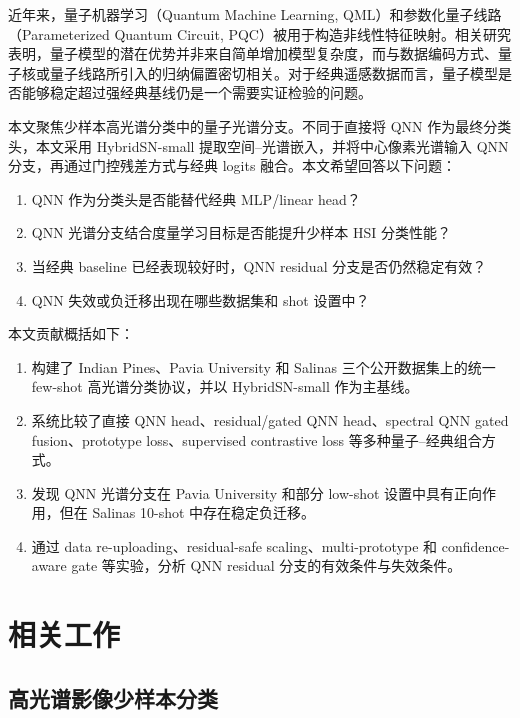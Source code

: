 \documentclass[UTF8,a4paper,zihao=-4,fontset=fandol]{ctexart}
\begin{document}
近年来，量子机器学习（Quantum Machine Learning, QML）和参数化量子线路（Parameterized Quantum Circuit, PQC）被用于构造非线性特征映射\cite{havlicek2019supervised,benedetti2019parameterized}。相关研究表明，量子模型的潜在优势并非来自简单增加模型复杂度，而与数据编码方式、量子核或量子线路所引入的归纳偏置密切相关\cite{schuld2021encoding,huang2021inductive,slattery2023numerical}。对于经典遥感数据而言，量子模型是否能够稳定超过强经典基线仍是一个需要实证检验的问题。

本文聚焦少样本高光谱分类中的量子光谱分支。不同于直接将 QNN 作为最终分类头，本文采用 HybridSN-small 提取空间--光谱嵌入，并将中心像素光谱输入 QNN 分支，再通过门控残差方式与经典 logits 融合。本文希望回答以下问题：

\begin{enumerate}[label=(\arabic*)]
  \item QNN 作为分类头是否能替代经典 MLP/linear head？
  \item QNN 光谱分支结合度量学习目标是否能提升少样本 HSI 分类性能？
  \item 当经典 baseline 已经表现较好时，QNN residual 分支是否仍然稳定有效？
  \item QNN 失效或负迁移出现在哪些数据集和 shot 设置中？
\end{enumerate}

本文贡献概括如下：

\begin{enumerate}[label=(\arabic*)]
  \item 构建了 Indian Pines、Pavia University 和 Salinas 三个公开数据集上的统一 few-shot 高光谱分类协议，并以 HybridSN-small 作为主基线。
  \item 系统比较了直接 QNN head、residual/gated QNN head、spectral QNN gated fusion、prototype loss、supervised contrastive loss 等多种量子--经典组合方式。
  \item 发现 QNN 光谱分支在 Pavia University 和部分 low-shot 设置中具有正向作用，但在 Salinas 10-shot 中存在稳定负迁移。
  \item 通过 data re-uploading、residual-safe scaling、multi-prototype 和 confidence-aware gate 等实验，分析 QNN residual 分支的有效条件与失效条件。
\end{enumerate}

\section{相关工作}

\subsection{高光谱影像少样本分类}
\end{document}
